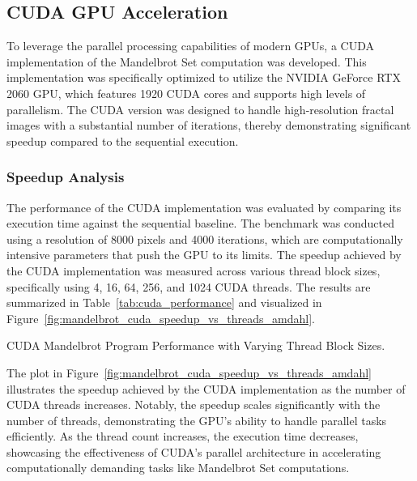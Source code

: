 \documentclass[
	report, %
	11pt, %
]{CSUniSchoolLabReport}
\newcounter{ct}
\begin{document}
\subsection{CUDA GPU Acceleration}

To leverage the parallel processing capabilities of modern GPUs, a CUDA implementation of the Mandelbrot Set computation was developed. This implementation was specifically optimized to utilize the NVIDIA GeForce RTX 2060 GPU, which features 1920 CUDA cores and supports high levels of parallelism. The CUDA version was designed to handle high-resolution fractal images with a substantial number of iterations, thereby demonstrating significant speedup compared to the sequential execution.

\subsubsection{Speedup Analysis}

The performance of the CUDA implementation was evaluated by comparing its execution time against the sequential baseline. The benchmark was conducted using a resolution of 8000 pixels and 4000 iterations, which are computationally intensive parameters that push the GPU to its limits. The speedup achieved by the CUDA implementation was measured across various thread block sizes, specifically using 4, 16, 64, 256, and 1024 CUDA threads. The results are summarized in Table~\ref{tab:cuda_performance} and visualized in Figure~\ref{fig:mandelbrot_cuda_speedup_vs_threads_amdahl}.


\begin{table}[H]
	\captionsetup{justification=centering, width=.8\linewidth}
	\centering

	\begin{adjustbox}{max width=\textwidth}
		
	\end{adjustbox}
	\caption{CUDA Mandelbrot Program Performance with Varying Thread Block Sizes.}
	\label{tab:cuda_performance}
\end{table}


The plot in Figure~\ref{fig:mandelbrot_cuda_speedup_vs_threads_amdahl} illustrates the speedup achieved by the CUDA implementation as the number of CUDA threads increases. Notably, the speedup scales significantly with the number of threads, demonstrating the GPU's ability to handle parallel tasks efficiently. As the thread count increases, the execution time decreases, showcasing the effectiveness of CUDA's parallel architecture in accelerating computationally demanding tasks like Mandelbrot Set computations.
\end{document}
